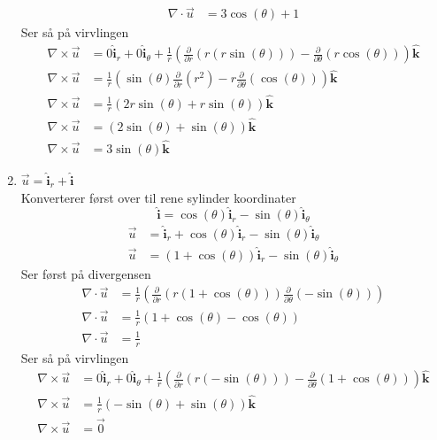 \documentclass[a4paper,10pt,norsk]{article}
\newcommand{\uvec}[1]{\boldsymbol{\hat{\textbf{#1}}}}
\begin{document}
\begin{enumerate}[i]
\begin{align*}
				\nabla \cdot \vec{u}  &= 3 \cos(\theta)  +1
			\end{align*}
			Ser så på virvlingen
			\begin{align*}
				\nabla \times \vec{u} &= 0 \uvec{i}_r + 0 \uvec{i}_{\theta} +
					 \frac{1}{r} \left( \frac{\partial }{\partial r} \left( r \left( r \sin(\theta)  \right)  \right)  - \frac{\partial }{\partial \theta} \left( r \cos(\theta)  \right)  \right) \uvec{k} \\
				\nabla \times \vec{u} &=  \frac{1}{r} \left( \sin(\theta) \frac{\partial }{\partial r} \left( r^2 \right) - r \frac{\partial }{\partial \theta} \left( \cos(\theta)  \right)   \right) \uvec{k}\\
				\nabla \times \vec{u} &= \frac{1}{r} \left( 2r \sin(\theta)  + r \sin(\theta)  \right) \uvec{k}\\
				\nabla \times \vec{u}  &= \left( 2 \sin(\theta)  + \sin(\theta)  \right) \uvec{k}\\
				\nabla \times \vec{u} &= 3 \sin(\theta) \uvec{k}
			\end{align*}
			\newpage
		\item $\vec{u}  = \uvec{i}_r + \uvec{i}$ \\
			Konverterer først over til rene sylinder koordinater \[
			\boxed{\uvec{i} = \cos(\theta)  \uvec{i}_r - \sin(\theta)  \uvec{i}_{\theta} }
			\] 
			\begin{align*}
				\vec{u} &= \uvec{i}_r + \cos(\theta) \uvec{i}_ r - \sin(\theta)  \uvec{i}_{\theta}\\
				\vec{u} &= \left( 1 + \cos(\theta)  \right) \uvec{i}_r - \sin(\theta) \uvec{i}_{\theta}
			\end{align*}
			Ser først på divergensen
			\begin{align*}
				\nabla \cdot \vec{u}  &= \frac{1}{r} \left( \frac{\partial }{\partial r} \left( r \left( 1 + \cos(\theta)  \right)  \right)  \frac{\partial }{\partial \theta} \left( - \sin(\theta)  \right)  \right) \\
				\nabla \cdot \vec{u}  &= \frac{1}{r} \left( 1 + \cos(\theta)  - \cos(\theta)  \right) \\
				\nabla \cdot \vec{u}  &= \frac{1}{r}
			\end{align*}
			Ser så på virvlingen
			\begin{align*}
				\nabla \times \vec{u} &= 0 \uvec{i}_r + 0 \uvec{i}_{\theta} + \frac{1}{r} \left( \frac{\partial }{\partial r}  \left( r \left( - \sin(\theta)  \right)  \right)  - \frac{\partial }{\partial \theta} \left( 1 + \cos(\theta)  \right)  \right) \uvec{k}\\
				\nabla \times \vec{u} &= \frac{1}{r} \left( - \sin(\theta) + \sin(\theta)  \right) \uvec{k}\\
				\nabla \times \vec{u} &= \vec{0} 
			\end{align*}
	\end{enumerate}
\end{document}

